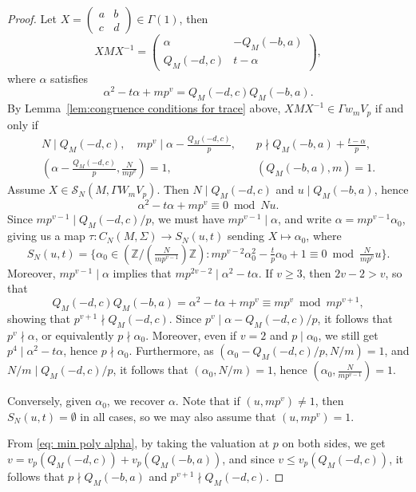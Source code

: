 \documentclass[12pt]{amsart}
\newcommand{\Z}{\mathbb{Z}}
\newcommand{\calS}{\mathcal{S}}
\numberwithin{equation}{subsection}
\theoremstyle{plain}\newtheorem{ithm}{Theorem}
\theoremstyle{plain}\newtheorem{iprop}[ithm]{Proposition}
\theoremstyle{definition}
\theoremstyle{remark}
\newcommand{\mattwo}[4]{\left( \begin{array}{cc} {#1} & {#2} \\ {#3} & {#4} \end{array} \right)}
\begin{document}
\begin{proof}
    Let $X = \mattwo{a}{b}{c}{d} \in \Gamma(1)$, then
    $$
     X M X^{-1} = \mattwo{\alpha}{-Q_M(-b,a)}{Q_M(-d,c)}{t-\alpha}, 
    $$
    where $\alpha$ satisfies
    \begin{equation} \label{eq: min poly alpha}
    \alpha^2 - t \alpha + mp^v = Q_M(-d, c) Q_M(-b, a).
    \end{equation}
    By Lemma~\ref{lem:congruence conditions for trace} above, $XMX^{-1} \in \Gamma w_m V_p$ if and only if 
    \begin{align}
    N \mid Q_M(-d,c), \quad  mp^v \mid \alpha - \frac{Q_M(-d,c)}{p}, \quad & p \nmid Q_M(-b,a) + \frac{t - \alpha}{p}, \\
    \left (\alpha - \frac{Q_M(-d,c)}{p}, \frac{N}{mp^v} \right) = 1, \quad & (Q_M(-b,a), m) = 1.
    \end{align}
    Assume $X \in \calS_N(M, \Gamma W_{m} V_p)$. Then $N \mid Q_M(-d,c)$ and $u \mid Q_M(-b,a)$, hence 
    $$
    \alpha^2 - t \alpha + mp^v \equiv 0 \bmod Nu.
    $$
    Since $mp^{v-1} \mid Q_M(-d,c)/p$, we must have $mp^{v-1} \mid \alpha$, and write $\alpha = mp^{v-1} \alpha_0$, 
    giving us a map $\tau : C_N(M, \Sigma) \to S_N(u,t)$ sending $X \mapsto \alpha_0$, where
    $$
    S_N(u,t) = \{ \alpha_0 \in (\Z / (\tfrac{N}{mp^{v-1}}) \Z) : mp^{v-2} \alpha_0^2 - \tfrac{t}{p} \alpha_0 + 1 \equiv 0 \bmod \tfrac{N}{mp^v} u\}.
    $$
    Moreover, $mp^{v-1} \mid \alpha$ implies that $mp^{2v-2} \mid \alpha^2 - t\alpha $. 
    If $v \ge 3$, then $2v-2 > v$, so that 
    $$ 
    Q_M(-d, c) Q_M(-b, a) = \alpha^2 - t \alpha + mp^v \equiv mp^v \bmod mp^{v+1}, 
    $$
    showing that $p^{v+1} \nmid Q_M(-d,c)$. Since $p^v \mid \alpha - Q_M(-d,c)/p$, it follows that $p^v \nmid \alpha$, or equivalently $p \nmid \alpha_0$. Moreover, even if $v = 2$ and $p \mid \alpha_0$, we still get $p^4 \mid \alpha^2 - t \alpha$, hence $p \nmid \alpha_0$.
    Furthermore, as $(\alpha_0 - Q_M(-d,c) / p, N/m) = 1$, and $N/m \mid Q_M(-d,c)/p$, it follows that $(\alpha_0, N/m) = 1$, hence $(\alpha_0, \tfrac{N}{mp^{v-1}}) = 1$. 
    
    Conversely, given $\alpha_0$, we recover $\alpha$. 
    Note that if $(u, mp^v) \ne 1$, then $S_N(u,t) = \emptyset$ in all cases, so we may also assume that $(u, mp^v) = 1$.
    
    From \eqref{eq: min poly alpha}, by taking the valuation at $p$ on both sides, we get $v = v_p(Q_M(-d,c)) + v_p(Q_M(-b,a))$, and since $v \le v_p(Q_M(-d,c))$, it follows that $p \nmid Q_M(-b,a)$ and $p^{v+1} \nmid Q_M(-d,c)$.  


\end{proof}
\end{document}
